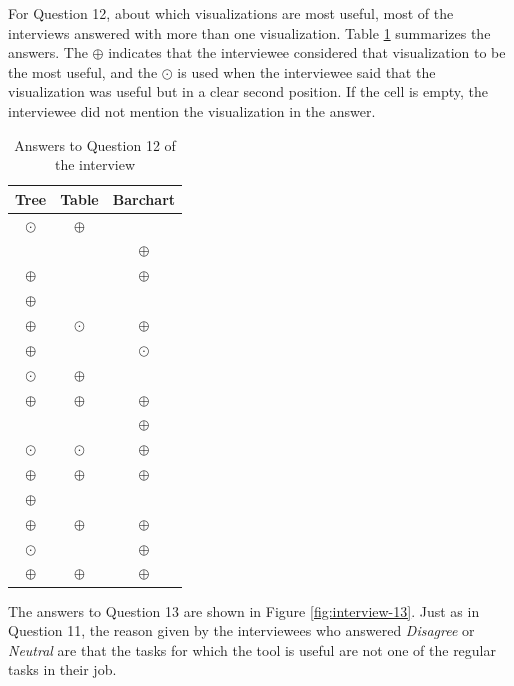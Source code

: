 For Question 12, about which visualizations are most useful, most of the interviews answered with more than one visualization. Table \ref{table:interview-12} summarizes the answers. The $\oplus$ indicates that the interviewee considered that visualization to be the most useful, and the $\odot$ is used when the interviewee said that the visualization was useful but in a clear second position. If the cell is empty, the interviewee did not mention the visualization in the answer.

\begin{table}[ht!]
    \begin{center}
    \begin{tabular}{|c|c|c|}
    \hline
    Tree      & Table     & Barchart \\
    \hline\hline
    $\odot$   & $\oplus$  & ~        \\\hline
    ~	        & ~	        & $\oplus$ \\\hline
    $\oplus$  & ~         & $\oplus$ \\\hline
    $\oplus$	& ~         & ~        \\\hline
    $\oplus$	& $\odot$	  & $\oplus$ \\\hline
    $\oplus$	& ~         & $\odot$  \\\hline
    $\odot$	  & $\oplus$	& ~        \\\hline
    $\oplus$	& $\oplus$	& $\oplus$ \\\hline
    ~	        & ~	        & $\oplus$ \\\hline
    $\odot$	  & $\odot$	  & $\oplus$ \\\hline
    $\oplus$	& $\oplus$	& $\oplus$ \\\hline
    $\oplus$	& ~	        & ~        \\\hline
    $\oplus$	& $\oplus$	& $\oplus$ \\\hline
    $\odot$	  & ~	        & $\oplus$ \\\hline
    $\oplus$	& $\oplus$	& $\oplus$ \\\hline
    \end{tabular}
    \end{center}
    \caption{Answers to Question 12 of the interview}
    \label{table:interview-12}
\end{table}

The answers to Question 13 are shown in Figure \ref{fig:interview-13}. Just as in Question 11, the reason given by the interviewees who answered \textit{Disagree} or \textit{Neutral} are that the tasks for which the tool is useful are not one of the regular tasks in their job.

